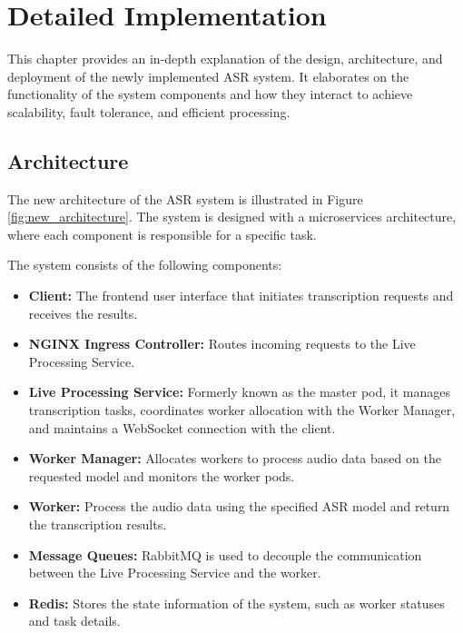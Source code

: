 \chapter{Detailed Implementation} \label{chapter:detailed_implementation}
This chapter provides an in-depth explanation of the design, architecture, and deployment of the newly implemented ASR system. It elaborates on the functionality of the system components and how they interact to achieve scalability, fault tolerance, and efficient processing.

\section{Architecture}
The new architecture of the ASR system is illustrated in Figure \ref{fig:new_architecture}. The system is designed with a microservices architecture, where each component is responsible for a specific task. 

The system consists of the following components:
\begin{itemize}
    \item \textbf{Client:} The frontend user interface that initiates transcription requests and receives the results.
    \item \textbf{NGINX Ingress Controller:} Routes incoming requests to the Live Processing Service.
    \item \textbf{Live Processing Service:} Formerly known as the master pod, it manages transcription tasks, coordinates worker allocation with the Worker Manager, and maintains a WebSocket connection with the client.
    \item \textbf{Worker Manager:} Allocates workers to process audio data based on the requested model and monitors the worker pods.
    \item \textbf{Worker:} Process the audio data using the specified ASR model and return the transcription results.
    \item \textbf{Message Queues:} RabbitMQ is used to decouple the communication between the Live Processing Service and the worker.
    \item \textbf{Redis:} Stores the state information of the system, such as worker statuses and task details.
\end{itemize}

